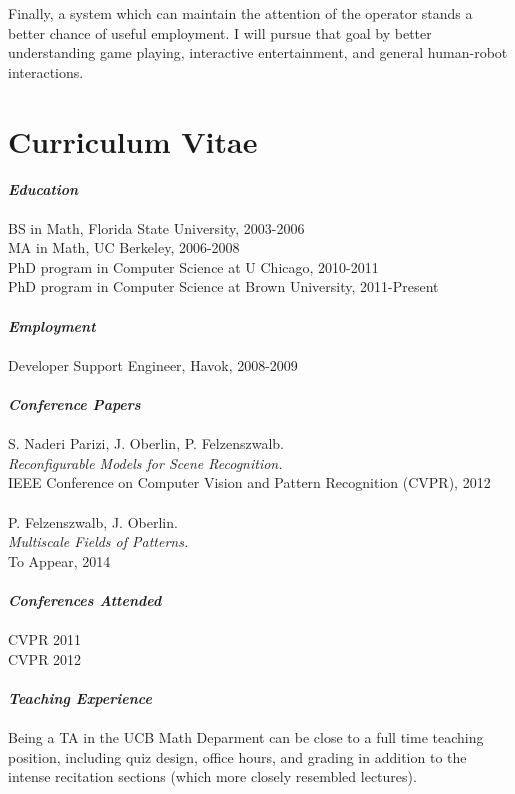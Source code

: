 \documentclass[12pt]{article}
\numberwithin{equation}{section}
\numberwithin{table}{section}
\numberwithin{figure}{section}
\begin{document}
Finally, a system which can maintain the attention of the operator stands a better chance of 
useful employment. I will pursue that goal by better understanding game playing, 
interactive entertainment, and general human-robot interactions.


\newpage

\section{Curriculum Vitae}
\textbf{\emph{Education}}\\
 \\
BS in Math, Florida State University, 2003-2006 \\
MA in Math, UC Berkeley, 2006-2008 \\
PhD program in Computer Science at U Chicago, 2010-2011 \\
PhD program in Computer Science at Brown University, 2011-Present \\
 \\ 
\textbf{\emph{Employment}}\\
\\
Developer Support Engineer, Havok, 2008-2009 \\
 \\
\textbf{\emph{Conference Papers}}\\
 \\
S. Naderi Parizi, J. Oberlin, P. Felzenszwalb.\\
\emph{Reconfigurable Models for Scene Recognition.}\\
IEEE Conference on Computer Vision and Pattern Recognition (CVPR), 2012\\
 \\
P. Felzenszwalb, J. Oberlin.  \\
\emph{Multiscale Fields of Patterns.}\\
To Appear, 2014 \\
 \\
\textbf{\emph{Conferences Attended}}\\
 \\
CVPR 2011\\
CVPR 2012 \\
 \\
\textbf{\emph{Teaching Experience}}\\
 \\
Being a TA in the UCB Math Deparment can be close to a full time teaching position, including
quiz design, office hours, and grading in addition to the intense recitation sections (which more closely resembled lectures). \\
\end{document}
